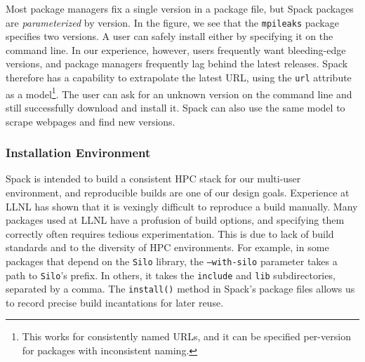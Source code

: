 Most package managers fix a single version in a package file, but Spack packages
are {\it parameterized} by version.  In the figure, we see that the {\tt mpileaks}
package specifies two versions.  A user can safely install either by 
specifying it on the command line.  In our experience, however, users
frequently want bleeding-edge versions, and package managers frequently lag 
behind the latest releases.  Spack therefore has a capability to extrapolate
the latest URL, using the {\tt url} attribute as a model\footnote{This works
for consistently named URLs, and it can be specified per-version for packages
with inconsistent naming.}.
The user can ask for an unknown version on the command line and still
successfully download and install it.  Spack can also use the same model to
scrape webpages and find new versions. 

\subsubsection{Installation Environment}

Spack is intended to build a consistent HPC stack for our multi-user
environment, and reproducible builds are one of our design goals.
Experience at LLNL has shown that it is vexingly difficult to reproduce
a build manually.
%
Many packages used at LLNL have a profusion of build options, and specifying them 
correctly often requires tedious experimentation.  This is due to lack of
build standards and to the diversity of HPC environments.  
For example, in some packages that depend on the {\tt Silo} library,
the {\tt ---with-silo} parameter takes a path to {\tt Silo}'s prefix.
In others, it takes the {\tt include} and {\tt lib} subdirectories,
separated by a comma.
The {\tt install()} method in Spack's package files allows us to record
precise build incantations for later reuse.


